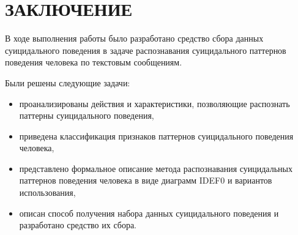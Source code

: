 \section*{ЗАКЛЮЧЕНИЕ}

В ходе выполнения работы было разработано средство сбора данных суицидального поведения в задаче распознавания суицидального паттернов поведения человека по текстовым сообщениям.

Были решены следующие задачи:
\begin{itemize}
	\item проанализированы действия и характеристики, позволяющие распознать паттерны суицидального поведения,
	\item приведена классификация признаков паттернов суицидального поведения человека,
	\item представлено формальное описание метода распознавания суицидальных паттернов поведения человека в виде диаграмм IDEF0 и вариантов использования,
	\item описан способ получения набора данных суицидального поведения и разработано средство их сбора.
\end{itemize}

\pagebreak